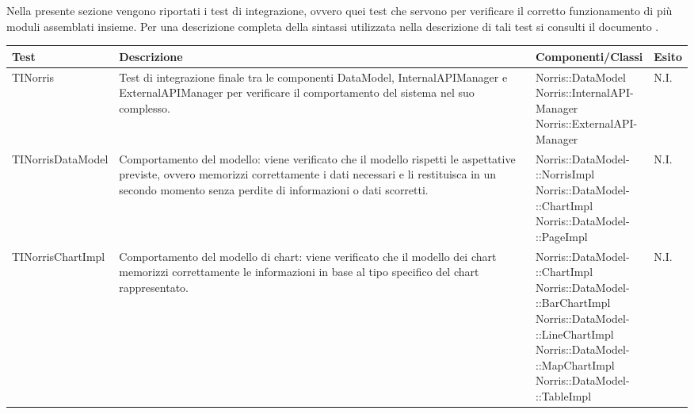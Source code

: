	Nella presente sezione vengono riportati i test di integrazione, ovvero quei test che servono per verificare il corretto funzionamento di più moduli assemblati insieme. Per una descrizione completa della sintassi utilizzata nella descrizione di tali test si consulti il documento .

\begin{longtabu}{| X | X | X[0.9] | X[0.3] |}

			\hline
			\rowfont{\bf}
			Test &
			Descrizione &
			Componenti/Classi &
			Esito \\
			\hline \endhead




	TINorris
	&
Test di integrazione finale tra le componenti DataModel, InternalAPIManager e ExternalAPIManager per verificare il comportamento del sistema nel suo complesso.
& \parbox[t]{0.6\textwidth}{
Norris::DataModel\\
Norris::InternalAPI-\\Manager\\
Norris::ExternalAPI-\\Manager}
			& N.I.
			\\ \hline



	TINorrisDataModel
	&
Comportamento del modello: viene verificato che il modello rispetti le aspettative previste, ovvero memorizzi correttamente i dati necessari e li restituisca in un secondo momento senza perdite di informazioni o dati scorretti.
& \parbox[t]{0.6\textwidth}{
Norris::DataModel-\\::NorrisImpl\\
Norris::DataModel-\\::ChartImpl\\
Norris::DataModel-\\::PageImpl}
			& N.I.
			\\ \hline



	TINorrisChartImpl
	&
Comportamento del modello di chart: viene verificato che il modello dei chart memorizzi correttamente le informazioni in base al tipo specifico del chart rappresentato.
& \parbox[t]{0.6\textwidth}{
Norris::DataModel-\\::ChartImpl\\
Norris::DataModel-\\::BarChartImpl\\
Norris::DataModel-\\::LineChartImpl\\
Norris::DataModel-\\::MapChartImpl\\
Norris::DataModel-\\::TableImpl}
			& N.I.
			\\ \hline




\end{longtabu}
